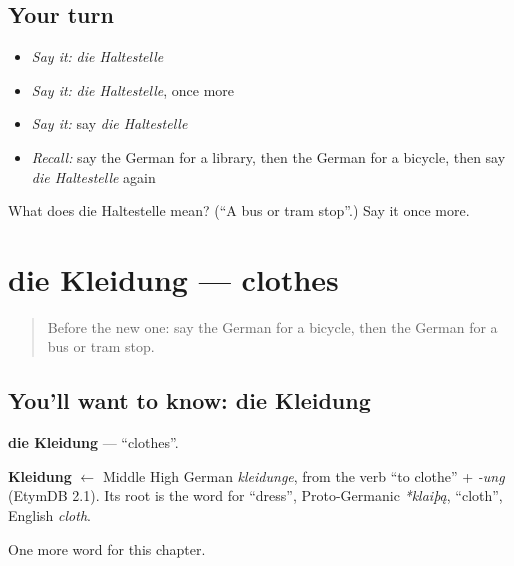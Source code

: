 \subsection*{Your turn}
\begin{itemize}
\raggedright
  \item \emph{Say it:} \emph{die Haltestelle}
  \item \emph{Say it:} \emph{die Haltestelle}, once more
  \item \emph{Say it:} say \emph{die Haltestelle}
  \item \emph{Recall:} say the German for a library, then the German for a bicycle, then say \emph{die Haltestelle} again
\end{itemize}

\begin{tcolorbox}[breakable,colback=teal!4,colframe=teal!35!black,title={Before you move on}]
What does die Haltestelle mean? (\textquotedblleft{}A bus or tram stop\textquotedblright{}.) Say it once more.
\end{tcolorbox}
\section[die Kleidung]{die Kleidung — clothes}

\label{lesson:GE-C98-kleidung}



\begin{quote}
Before the new one: say the German for a bicycle, then the German for a bus or tram stop.
\end{quote}

\subsection*{You'll want to know: die Kleidung}
\textbf{die Kleidung} — \textquotedblleft{}clothes\textquotedblright{}.

\begin{cousinweb}
\textbf{Kleidung} $\leftarrow$ Middle High German \emph{kleidunge}, from the verb \textquotedblleft{}to clothe\textquotedblright{} + \emph{-ung} (EtymDB 2.1). Its root is the word for \textquotedblleft{}dress\textquotedblright{}, Proto-Germanic \emph{*klaiþą}, \textquotedblleft{}cloth\textquotedblright{}, English \emph{cloth}.
\end{cousinweb}

\begin{grammarlens}[title={What you've built}]
One more word for this chapter.
\end{grammarlens}


